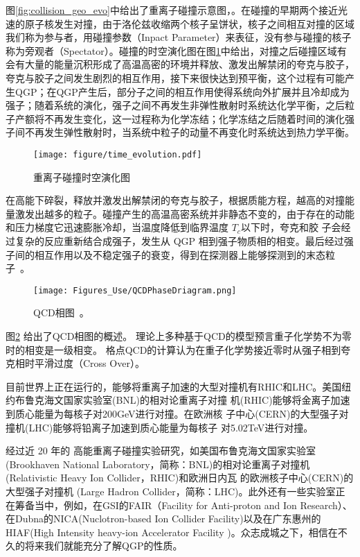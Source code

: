 图\ref{fig:collision_geo_evo}中给出了重离子碰撞示意图，。在碰撞的早期两个接近光速的原子核发生对撞，由于洛伦兹收缩两个核子呈饼状，核子之间相互对撞的区域我们称为参与者，用碰撞参数（Inpact Parameter）来表征，没有参与碰撞的核子称为旁观者（Spectator）。碰撞的时空演化图在图\ref{fig:collision_geo_evo2}中给出，对撞之后碰撞区域有会有大量的能量沉积形成了高温高密的环境并释放、激发出解禁闭的夸克与胶子，夸克与胶子之间发生剧烈的相互作用，接下来很快达到预平衡，这个过程有可能产生QGP；在QGP产生后，部分子之间的相互作用使得系统向外扩展并且冷却成为强子；随着系统的演化，强子之间不再发生非弹性散射时系统达化学平衡，之后粒子产额将不再发生变化，这一过程称为化学冻结；化学冻结之后随着时间的演化强子间不再发生弹性散射时，当系统中粒子的动量不再变化时系统达到热力学平衡。
\begin{figure}[htbp]
\centering
\texttt{[image: figure/time\_evolution.pdf]}
\caption{重离子碰撞时空演化图}
\label{fig:collision_geo_evo2}
\end{figure}

在高能下碎裂，释放并激发出解禁闭的夸克与胶子，根据质能方程，越高的对撞能量激发出越多的粒子。碰撞产生的高温高密系统并非静态不变的，由于存在的动能和压力梯度它迅速膨胀冷却，当温度降低到临界温度 $T_c$以下时，夸克和胶 子会经过复杂的反应重新结合成强子，发生从 QGP 相到强子物质相的相变。最后经过强子间的相互作用以及不稳定强子的衰变，得到在探测器上能够探测到的末态粒子~\cite{XiaofengCPreview}。
\begin{figure}[htbp]
\centering
\texttt{[image: Figures\_Use/QCDPhaseDriagram.png]}
\caption{QCD相图~\cite{CAINES2017121}。} %
\label{fig:qcd_phase}
\end{figure}
图\ref{fig:qcd_phase} 给出了QCD相图的概述。 理论上多种基于QCD的模型预言重子化学势不为零时的相变是一级相变。%
格点QCD的计算认为在重子化学势接近零时从强子相到夸克相时平滑过度（Cross Over）\cite{Aoki:2006we}。

目前世界上正在运行的，能够将重离子加速的大型对撞机有RHIC和LHC。美国纽约布鲁克海文国家实验室(BNL)的相对论重离子对撞 机(RHIC)能够将金离子加速到质心能量为每核子对200GeV进行对撞。在欧洲核 子中心(CERN)的大型强子对撞机(LHC)能够将铅离子加速到质心能量为每核子 对5.02TeV进行对撞。


经过近 20 年的 高能重离子碰撞实验研究，如美国布鲁克海文国家实验室(Brookhaven National Laboratory，简称：BNL)的相对论重离子对撞机(Relativistic Heavy Ion Collider，RHIC)和欧洲日内瓦 的欧洲核子中心(CERN)的大型强子对撞机 (Large Hadron Collider，简称：LHC)。此外还有一些实验室正在筹备当中，例如，在GSI的FAIR（Facility for Anti-proton and Ion Research）\cite{Heuser:2009gg}、在Dubna的NICA(Nuclotron-based Ion Collider Facility)\cite{MOHANTY2009899c}以及在广东惠州的HIAF(High Intensity heavy-ion Accelerator Facility )。众志成城之下，相信在不久的将来我们就能充分了解QGP的性质。

